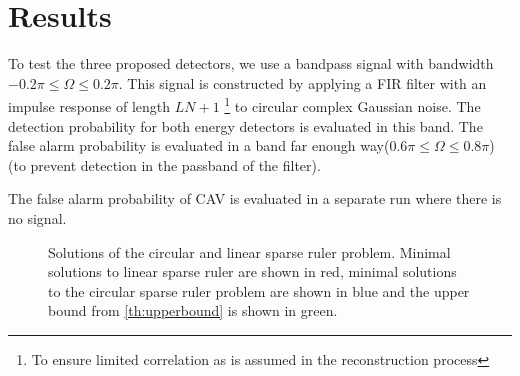 \documentclass[a4paper, openany, oneside]{memoir}
\begin{document}
\section{Results}

To test the three proposed detectors, we use a bandpass signal with bandwidth $-0.2\pi \leq \Omega \leq 0.2\pi$. This signal is constructed by applying a FIR filter with an impulse response of length $LN+1$ \footnote{To ensure limited correlation as is assumed in the reconstruction process} to circular complex Gaussian noise. The detection probability for both energy
detectors is evaluated in this band. The false alarm probability is evaluated in a band far enough way($0.6\pi \leq \Omega \leq 0.8\pi$) (to prevent detection in the passband of the filter).

The false alarm probability of CAV is evaluated in a separate run where there is no signal.


\begin{figure}[H]
\caption{Solutions of the circular and linear sparse ruler problem. Minimal solutions to linear sparse ruler are shown in red, minimal solutions to the circular sparse ruler problem are shown in blue and the upper bound from \cref{th:upperbound} is shown in green.}\label{fig:comparison_sparse_ruler}
\end{figure}
\end{document}
